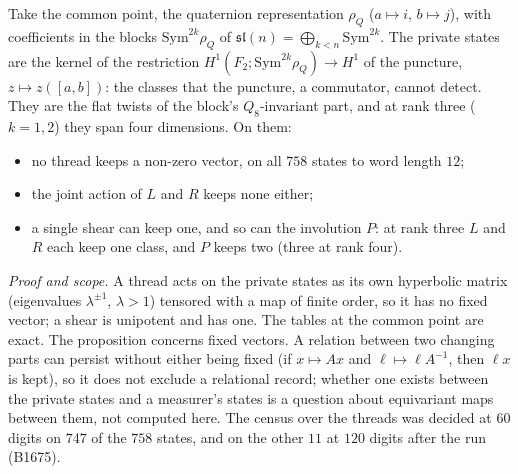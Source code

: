 \begin{proposition}\label{prop:records}
Take the common point, the quaternion representation $\rho_Q$ ($a\mapsto i$, $b\mapsto j$), with coefficients in the
blocks $\mathrm{Sym}^{2k}\rho_Q$ of $\mathfrak{sl}(n)=\bigoplus_{k<n}\mathrm{Sym}^{2k}$. The private states are the kernel
of the restriction $H^1(F_2;\mathrm{Sym}^{2k}\rho_Q)\to H^1$ of the puncture, $z\mapsto z([a,b])$: the classes that the
puncture, a commutator, cannot detect. They are the flat twists of the block's $Q_8$-invariant part, and at rank three
($k=1,2$) they span four dimensions. On them:
\begin{itemize}
\item no thread keeps a non-zero vector, on all $758$ states to word length $12$;
\item the joint action of $L$ and $R$ keeps none either;
\item a single shear can keep one, and so can the involution $P$: at rank three $L$ and $R$ each keep one class, and
  $P$ keeps two (three at rank four).
\end{itemize}
\end{proposition}
\noindent\emph{Proof and scope.} A thread acts on the private states as its own hyperbolic matrix (eigenvalues
$\lambda^{\pm1}$, $\lambda>1$) tensored with a map of finite order, so it has no fixed vector; a shear is unipotent and
has one. The tables at the common point are exact. The proposition concerns fixed vectors. A relation between two
changing parts can persist without either being fixed (if $x\mapsto Ax$ and $\ell\mapsto\ell A^{-1}$, then $\ell x$ is
kept), so it does not exclude a relational record; whether one exists between the private states and a measurer's
states is a question about equivariant maps between them, not computed here. The census over the threads was decided at $60$ digits on $747$ of
the $758$ states, and on the other $11$ at $120$ digits after the run (B1675).


